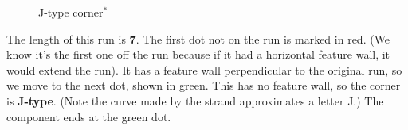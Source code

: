\documentclass[openany]{book}
\newcommand{\gen}{\hyperref[generated]{$^*$}}%
\begin{document}
\begin{figure}[H]\centering
{}
\caption{J-type corner\gen}
\end{figure}
The length of this run is \textbf{7}. The first dot not on the run is marked in red. (We know it's the first one off the run because if it had a horizontal feature wall, it would extend the run). It has a feature wall perpendicular to the original run, so we move to the next dot, shown in green. This has no feature wall, so the corner is \textbf{J-type}. (Note the curve made by the strand approximates a letter J.) The component ends at the green dot.
\medskip
\end{document}
